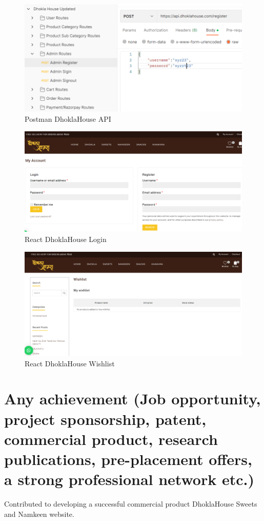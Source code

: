 \documentclass[a4paper, 12pt]{article}
\begin{document}
\begin{figure}
    \centering
    \includegraphics[scale=0.60,frame]{postman routes.png}
    \caption{Postman DhoklaHouse API}
\end{figure}
\begin{figure}
    \centering
    \includegraphics[scale=0.34,frame]{dhoklahouse UI.png}
    \caption{React DhoklaHouse Login}
    
\end{figure}
\begin{figure}
    \centering
    \includegraphics[scale=0.33,frame]{dhoklahouse wishlist.png}
    \caption{React DhoklaHouse Wishlist}
    
\end{figure}

\section{Any achievement (Job opportunity, project sponsorship, patent, commercial
product, research publications, pre-placement offers, a strong professional
network etc.)}
\hspace{10mm} Contributed to developing a successful commercial product DhoklaHouse Sweets and Namkeen website.
\end{document}
